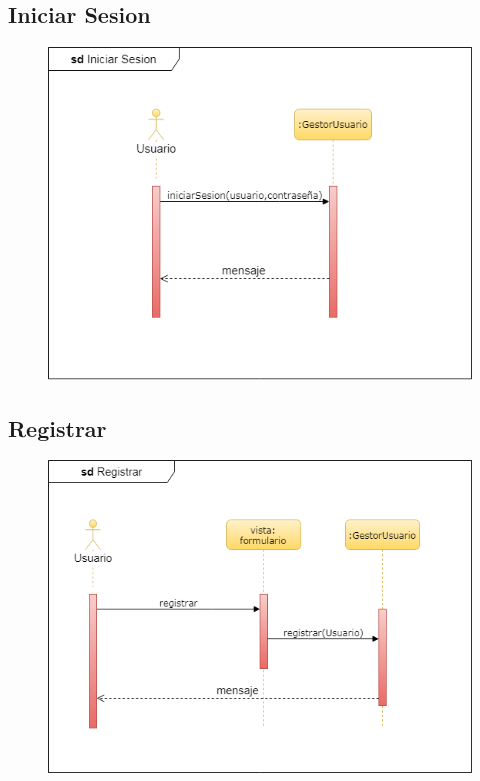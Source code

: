		\subsection{Iniciar Sesion}
			\begin{figure}[H]
				\centering
					\includegraphics{imagenes/DiagramasUML/sdIniciarSesion.png}
					\label{fig:diagrama-secuencia-autenticar}
			\end{figure}

		\subsection{Registrar}
			\begin{figure}[H]
				\centering
				\includegraphics{imagenes/DiagramasUML/sdRegistrar.png}
					\label{fig:diagrama-secuencia-registrar}
			\end{figure}

